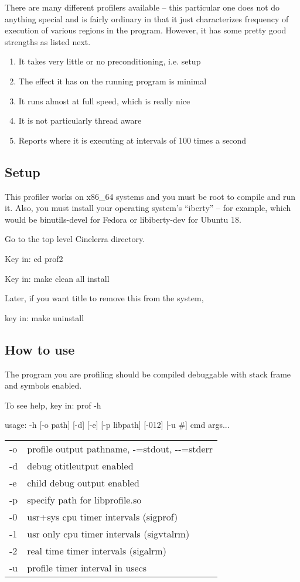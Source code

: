 There are many different profilers available -- this particular one does not do anything special and is fairly ordinary in that it just characterizes frequency of execution of various regions in the program. However, it has some pretty good strengths as listed next.
\medskip
\begin{enumerate}[nosep]
	\item It takes very little or no preconditioning, i.e. setup
	\item The effect it has on the running program is minimal
	\item It runs almost at full speed, which is really nice
	\item It is not particularly thread aware
	\item Reports where it is executing at intervals of 100 times a second
\end{enumerate}
\subsection{Setup}

This profiler works on x86\_64 systems and you must be root to compile and run it. Also, you must install your operating system's ``iberty'' -- for example, which would be binutils-devel for Fedora or libiberty-dev for Ubuntu 18.
\medskip

Go to the top level Cinelerra directory.

Key in: \qquad cd prof2

Key in: \qquad make clean all install

Later, if you want title to remove this from the system,

key in: \qquad make uninstall
\subsection{How to use}

The program you are profiling should be compiled debuggable with stack frame and symbols enabled.
\medskip

To see help, key in: \quad prof -h
\smallskip

usage: -h [-o path] [-d] [-e] [-p libpath] [-012] [-u \#] cmd args...

\hspace{2em}
\begin{tabular}{@{}ll}
	-o & profile output pathname, -=stdout, -{}-=stderr\\
	-d & debug otitleutput enabled\\
	-e & child debug output enabled\\
	-p & specify path for libprofile.so\\
	-0 & usr+sys cpu timer intervals (sigprof)\\
	-1 & usr only cpu timer intervals (sigvtalrm)\\
	-2 & real time timer intervals (sigalrm)\\
	-u & profile timer interval in usecs\\
\end{tabular}
\medskip

